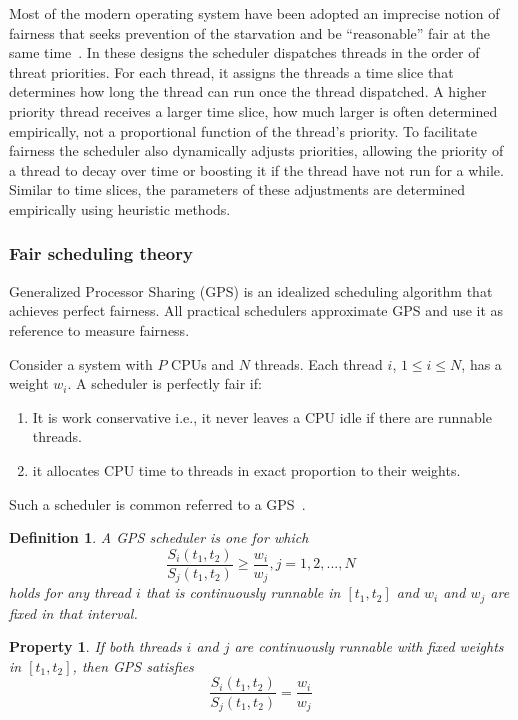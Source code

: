 \documentclass[11pt]{article}
\begin{document}
Most of the modern operating system have been adopted an imprecise notion of fairness that seeks prevention of the starvation and be ``reasonable'' fair at the same time~\cite{li09}. In these designs the scheduler dispatches threads in the order of threat priorities. For each thread, it assigns the threads a time slice that determines how long the thread can run once the thread dispatched. A higher priority thread receives a larger time slice, how much larger is often determined empirically, not a proportional function of the thread's priority. To facilitate fairness the scheduler also dynamically adjusts priorities, allowing the priority of a thread to decay over time or boosting it if the thread have not run for a while. Similar to time slices, the parameters of these adjustments are determined empirically using heuristic methods.  

\subsubsection{Fair scheduling theory}
Generalized Processor Sharing (GPS) is an idealized scheduling algorithm that achieves perfect fairness. All practical schedulers approximate GPS and use it as reference to measure fairness.

Consider a system with $P$ CPUs and $N$ threads. Each thread $i$, $1 \leq i \leq N$, has a weight $w_i$. A scheduler is perfectly fair if:
\begin{enumerate}
	\item It is work conservative i.e., it never leaves a CPU idle if there are runnable threads.
	\item it allocates CPU time to threads in exact proportion to their weights.
\end{enumerate}
Such a scheduler is common referred to a GPS~\cite{parekh93}.

\newtheorem{gps-model}{Definition}
\begin{gps-model}
A GPS scheduler is one for which
$$\frac{S_i(t_1, t_2)}{S_j(t_1, t_2)} \geq \frac{w_i}{w_j}, j=1, 2, ..., N$$
holds for any thread $i$ that is continuously runnable in $[t_1, t_2]$ and $w_i$ and $w_j$ are fixed in that interval. 
\end{gps-model}

\newtheorem{gps-props}{Property}
\begin{gps-props}
If both threads $i$ and $j$ are continuously runnable with fixed weights in $[t_1, t_2]$, then GPS satisfies 
$$\frac{S_i(t_1, t_2)}{S_j(t_1, t_2)} = \frac{w_i}{w_j}$$
\end{gps-props}
\end{document}
